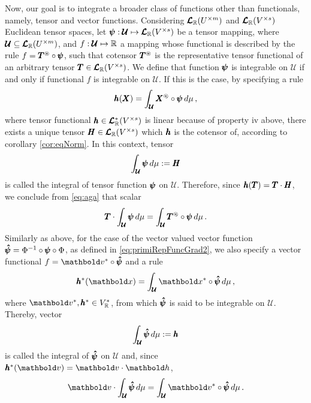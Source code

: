 Now, our goal is to integrate a broader class of functions other than functionals, namely, tensor and vector functions. Considering $\pmb{\mathcal{L}}_{\mathbb{R}}(U^{\times m})$ and $\pmb{\mathcal{L}}_{\mathbb{R}}(V^{\times s})$ Euclidean tensor spaces, let $\pmb{\psi} : \pmb{\mathcal{U}} \mapsto \pmb{\mathcal{L}}_{\mathbb{R}}(V^{\times s})$ be a tensor mapping, where $\pmb{\mathcal{U}}\subseteq\pmb{\mathcal{L}}_{\mathbb{R}}(U^{\times m})$, and $f : \pmb{\mathcal{U}} \mapsto \mathbb{R}$ a mapping whose functional is described by the rule $f = \pmb{{T}}^\circledast\circ\pmb{\psi}$, such that cotensor $\pmb{{T}}^\circledast$ is the representative tensor functional of an arbitrary tensor $\pmb{T}\in\pmb{\mathcal{L}}_{\mathbb{R}}(V^{\times s})$. We define that function $\pmb{\psi}$ is integrable on $\pmb{\mathcal{U}}$ if and only if functional $f$ is integrable on $\pmb{\mathcal{U}}$. If this is the case, by specifying a rule
\begin{equation}\label{eq:aga}
\pmb{h}(\pmb{X}) = \int_{\pmb{\mathcal{U}}} \pmb{{X}}^\circledast\circ\pmb{\psi}\,d\mu\,,
\end{equation}
where tensor functional $\pmb{h}\in\pmb{\mathcal{L}}_{\mathbb{R}}^*(V^{\times s})$ is linear because of property iv above, there exists a unique tensor $\pmb{H}\in\pmb{\mathcal{L}}_{\mathbb{R}}(V^{\times s})$ which $\pmb{h}$ is the cotensor of, according to corollary \ref{cor:eqNorm}. In this context, tensor
\begin{equation}
\int_{\pmb{\mathcal{U}}}\pmb{\psi}\,d\mu:=\pmb{H}
\end{equation}
is called the integral of tensor function $\pmb{\psi}$ on $\pmb{\mathcal{U}}$. Therefore, since $\pmb{h}(\pmb{T})=\pmb{T}\cdot\pmb{H}$, we conclude from \eqref{eq:aga} that scalar
\begin{equation}\label{eq:repInte}
\pmb{T}\cdot\int_{\pmb{\mathcal{U}}}\pmb{\psi}\,d\mu=\int_{\pmb{\mathcal{U}}} \pmb{{T}}^\circledast\circ\pmb{\psi}\,d\mu\,.
\end{equation}
Similarly as above, for the case of the vector valued vector function $\pmb{\hat{\psi}}=\Phi^{-1}\circ\pmb{\psi}\circ\Phi$, as defined in \eqref{eq:primiRepFuncGrad2}, we also specify a vector functional $f = \vto{v}^*\circ\tnr{\hat{\psi}}$ and a rule
\begin{equation}
\fua{\tnr{h}^*}{\vto{x}} = \int_{\pmb{\mathcal{U}}} \vto{x}^*\circ\tnr{\hat{\psi}}\,d\mu\,,
\end{equation}
where $\vto{v}^*,\tnr{h}^*\in V^*_\real$, from which $\pmb{\hat{\psi}}$ is said to be integrable on $\pmb{\mathcal{U}}$. Thereby, vector
\begin{equation}
\int_{\pmb{\mathcal{U}}}\pmb{\hat{\psi}}\,d\mu:=\pmb{h}
\end{equation}
is called the integral of $\pmb{\hat{\psi}}$ on $\pmb{\mathcal{U}}$ and, since $\fua{\tnr{h}^*}{\vto{v}}=\vto{v}\cdot\vto{h}$,
\begin{equation}
\vto{v}\cdot\int_{\pmb{\mathcal{U}}}\tnr{\hat{\psi}}\,d\mu=\int_{\pmb{\mathcal{U}}} \vto{v}^*\circ\tnr{\hat{\psi}}\,d\mu\,.
\end{equation}


